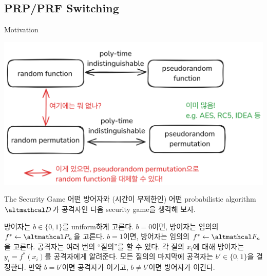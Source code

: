 \documentclass[../250428_msquare_provable_security.tex]{subfiles}
\begin{document}
\subsection{PRP/PRF Switching}
\begin{frame}{Motivation}
    \begin{center}
        \includegraphics[width=.9\textwidth]{../switching_motivation.png}
    \end{center}
\end{frame}

\begin{frame}{The Security Game}
    어떤 방어자와 (시간이 무제한인) 어떤 probabilistic algorithm \(\mcal{D}\)가 공격자인
    다음 security game을 생각해 보자.
    \pause
    \begin{enumerate}
        \ii
        방어자는 \(b \in \{0,1\}\)를 uniform하게 고른다.
        \pause
        \ii
        \(b = 0\)이면, 방어자는
        임의의 \(f^\ast \gets \mcal{P}_n\)을 고른다.
        \ii
        \(b = 1\)이면, 방어자는
        임의의 \(f^\ast \gets \mcal{F}_n\)을 고른다.
        \pause
        \ii
        공격자는 여러 번의 ``질의''를 할 수 있다.
        각 질의 \(x_i\)에 대해 방어자는 \(y_i = f^\ast(x_i)\)를 공격자에게 알려준다.
        \pause
        \ii
        모든 질의의 마지막에 공격자는 \(b' \in \{0,1\}\)을 결정한다.
        만약 \(b = b'\)이면 공격자가 이기고, \(b \neq b'\)이면 방어자가 이긴다.
    \end{enumerate}
\end{frame}
\end{document}
